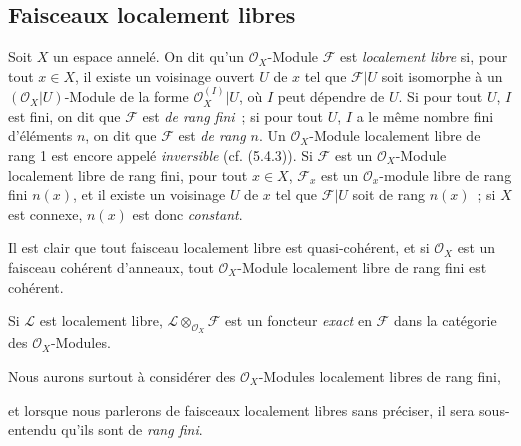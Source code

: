 \subsection{Faisceaux localement libres}
\label{subsection:0.5.4-fr}

\begin{env}[5.4.1]
\label{0.5.4.1-fr}
Soit $X$ un espace annelé. On dit qu'un $\mathcal{O}_X$-Module $\mathcal{F}$
est \emph{localement libre} si, pour tout $x\in X$, il existe un voisinage
ouvert $U$ de $x$ tel que $\mathcal{F}|U$ soit isomorphe à un
$(\mathcal{O}_X|U)$-Module de la forme $\mathcal{O}_X^{(I)}|U$, où $I$ peut
dépendre de $U$. Si pour tout $U$, $I$ est fini, on dit que $\mathcal{F}$ est
\emph{de rang fini}~; si pour tout $U$, $I$ a le même nombre fini d'éléments
$n$, on dit que $\mathcal{F}$ est \emph{de rang $n$}. Un
$\mathcal{O}_X$-Module localement libre de rang 1 est encore appelé
\emph{inversible} (cf. (5.4.3)). Si $\mathcal{F}$ est un
$\mathcal{O}_X$-Module localement libre de rang fini, pour tout $x\in X$,
$\mathcal{F}_x$ est un $\mathcal{O}_x$-module libre de rang fini $n(x)$, et il
existe un voisinage $U$ de $x$ tel que $\mathcal{F}|U$ soit de rang $n(x)$~;
si $X$ est connexe, $n(x)$ est donc \emph{constant}.

Il est clair que tout faisceau localement libre est quasi-cohérent, et si
$\mathcal{O}_X$ est un faisceau cohérent d'anneaux, tout
$\mathcal{O}_X$-Module localement libre de rang fini est cohérent.

Si $\mathcal{L}$ est localement libre,
$\mathcal{L}\otimes_{\mathcal{O}_X}\mathcal{F}$ est un foncteur \emph{exact}
en $\mathcal{F}$ dans la catégorie des $\mathcal{O}_X$-Modules.

Nous aurons surtout à considérer des $\mathcal{O}_X$-Modules localement libres
de rang fini,


et lorsque nous parlerons de faisceaux localement libres sans préciser, il
sera sous-entendu qu'ils sont de \emph{rang fini}.
\end{env}

